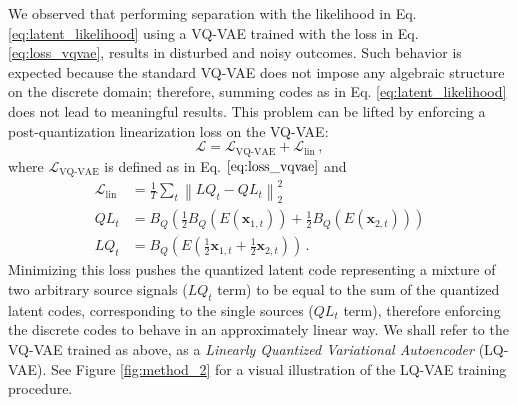 \documentclass[a4paper]{article}
\begin{document}
We observed that performing separation with the likelihood in Eq. \eqref{eq:latent_likelihood} using a VQ-VAE trained with the loss in
Eq. \eqref{eq:loss_vqvae}, results in disturbed and noisy outcomes. Such behavior is expected because the standard VQ-VAE does not impose any algebraic structure on the discrete domain; therefore, summing codes as in Eq. \eqref{eq:latent_likelihood} does not lead to meaningful results. This problem can be lifted by enforcing a post-quantization linearization loss on the VQ-VAE: 
\begin{equation}
    \mathcal{L} = \mathcal{L}_{\text{VQ-VAE}} + \mathcal{L}_{\text{lin}} \,,
\end{equation}
where $\mathcal{L}_{\text{VQ-VAE}}$ is defined as in Eq. $\eqref{eq:loss_vqvae}$  and
\begin{align}
    \label{eq:ll}
    \mathcal{L}_\text{lin} &= \frac{1}{T} \sum_{t}{\left\lVert
    LQ_t - QL_t\right\rVert^2_2} \\ 
    \label{eq:ql}
    QL_t &=B_Q\left( \tfrac{1}{2}B_Q\left(E\left(\mathbf{x}_{1,t}\right)\right) + \tfrac{1}{2}B_Q\left(E\left(\mathbf{x}_{2,t}\right)\right)\right) \\ 
    \label{eq:lq}
    LQ_t &= B_Q\left(E\left(\tfrac{1}{2}\mathbf{x}_{1,t} + \tfrac{1}{2} \mathbf{x}_{2,t}\right)\right) \,.
\end{align}
Minimizing this loss pushes the quantized latent code representing a mixture of two arbitrary source signals ($LQ_t$ term) to be equal to the sum of the quantized latent codes, corresponding to the single sources ($QL_t$ term), therefore enforcing the discrete codes to behave in an approximately linear way.
We shall refer to the VQ-VAE trained as above, as a {\em Linearly Quantized Variational Autoencoder} (LQ-VAE). See Figure \ref{fig:method_2} for a visual illustration of the LQ-VAE training procedure.
\end{document}
